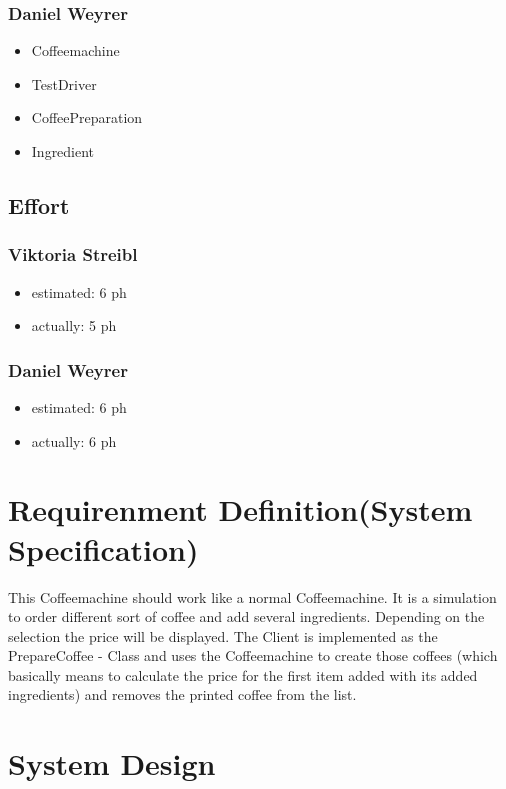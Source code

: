 \subsubsection{Daniel Weyrer}
\begin{itemize}
	\item Coffeemachine
	\item TestDriver
	\item CoffeePreparation
	\item Ingredient
\end{itemize}

\subsection{Effort}

\subsubsection {Viktoria Streibl}
\begin{itemize}
	\item estimated: 6 ph 
	\item actually: 5 ph
\end{itemize}

\subsubsection {Daniel Weyrer}
\begin{itemize}
	\item estimated: 6 ph 
	\item actually: 6 ph
\end{itemize}

\section{Requirenment Definition(System Specification)}
This Coffeemachine should work like a normal Coffeemachine. It is a simulation to order different sort of coffee and add several ingredients. Depending on the selection the price will be displayed.
The Client is implemented as the PrepareCoffee - Class and uses the Coffeemachine to create those coffees (which basically means to calculate the price for the first item added with its added ingredients) and removes the printed coffee from the list.

\section{System Design}
